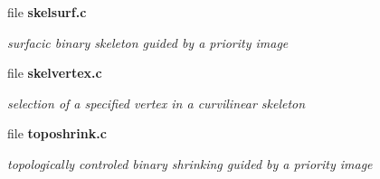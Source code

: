\begin{DoxyCompactItemize}
\item 
file {\bf skelsurf.c}


\begin{DoxyCompactList}\small\item\em surfacic binary skeleton guided by a priority image \item\end{DoxyCompactList}

\item 
file {\bf skelvertex.c}


\begin{DoxyCompactList}\small\item\em selection of a specified vertex in a curvilinear skeleton \item\end{DoxyCompactList}

\item 
file {\bf toposhrink.c}


\begin{DoxyCompactList}\small\item\em topologically controled binary shrinking guided by a priority image \item\end{DoxyCompactList}

\end{DoxyCompactItemize}
